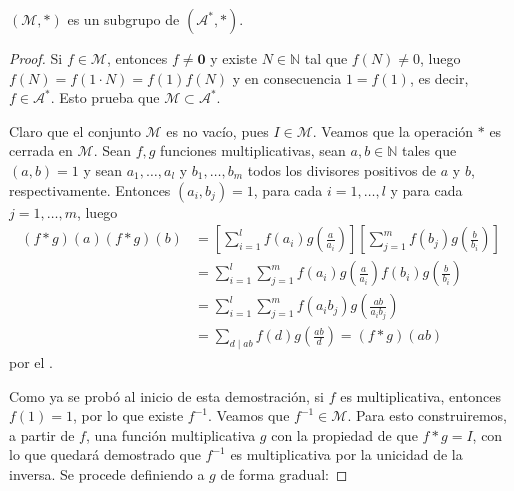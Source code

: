 \begin{theorem}\label{thm:sb1}
$(\mathcal{M},*)$ es un subgrupo de $(\mathcal{A}^*,*)$.
\end{theorem}
\begin{proof}
Si $f \in \mathcal{M}$, entonces $f \ne \mathbf{0}$ y existe $N \in \mathbb{N}$ tal que $f(N) \ne 0$, luego $f(N)=f(1 \cdot N)=f(1)f(N)$ y en consecuencia $1=f(1)$, es decir, $f \in \mathcal{A}^*$. Esto prueba que $\mathcal{M} \subset \mathcal{A}^*$.
\bigskip

Claro que el conjunto $\mathcal{M}$ es no vacío, pues $I \in \mathcal{M}$. Veamos que la operación $*$ es cerrada en $\mathcal{M}$. Sean $f,g$ funciones multiplicativas, sean $a,b \in \mathbb{N}$ tales que $(a,b)=1$ y sean $a_1,\ldots,a_l$ y $b_1,\ldots,b_m$ todos los divisores positivos de $a$ y $b$, respectivamente. Entonces $(a_i,b_j)=1$, para cada $i=1,\ldots,l$ y para cada $j=1,\ldots,m$, luego
\begin{align*}
	(f*g)(a)(f*g)(b) &= \left[ \sum_{i=1}^{l} f(a_i)g\left( \frac{a}{a_i} \right) \right]\left[ \sum_{j=1}^{m} f(b_j)g \left( \frac{b}{b_i} \right) \right] \\
					 &= \sum_{i=1}^{l} \sum_{j=1}^{m} f(a_i)g \left( \frac{a}{a_i} \right)f(b_i)g \left( \frac{b}{b_i} \right) \\
					 &= \sum_{i=1}^{l} \sum_{j=1}^{m} f(a_i b_j)g \left( \frac{a b}{a_i b_j} \right) \\
					 &= \sum_{d \mid a b}f(d)g \left( \frac{a b}{d} \right) = (f*g)(a b)
\end{align*}
por el .
\bigskip

\thispagestyle{easter4}

Como ya se probó al inicio de esta demostración, si $f$ es multiplicativa, entonces $f(1)=1$, por lo que existe $f^{-1}$. Veamos que $f^{-1} \in \mathcal{M}$. Para esto construiremos, a partir de $f$, una función multiplicativa $g$ con la propiedad de que $f*g=I$, con lo que quedará demostrado que $f^{-1}$ es multiplicativa por la unicidad de la inversa. Se procede definiendo a $g$ de forma gradual:


\end{proof}
